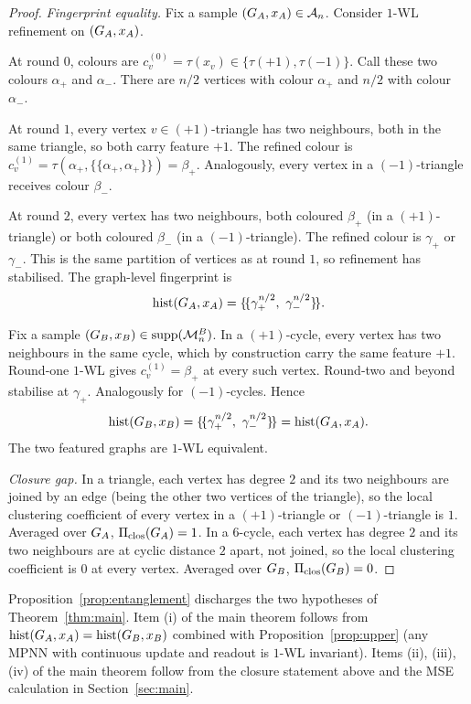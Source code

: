 \begin{proof}
\emph{Fingerprint equality.} Fix a sample $(G_A, x_A) \in
\mathcal{A}_n$. Consider $1$-WL refinement on $(G_A, x_A)$.

At round $0$, colours are $c_v^{(0)} = \tau(x_v) \in \{\tau(+1),
\tau(-1)\}$. Call these two colours $\alpha_+$ and $\alpha_-$. There
are $n/2$ vertices with colour $\alpha_+$ and $n/2$ with colour
$\alpha_-$.

At round $1$, every vertex $v \in (+1)$-triangle has two neighbours,
both in the same triangle, so both carry feature $+1$. The refined
colour is $c_v^{(1)} = \tau(\alpha_+, \{\!\{\alpha_+, \alpha_+\}\!\}) =
\beta_+$. Analogously, every vertex in a $(-1)$-triangle receives
colour $\beta_-$.

At round $2$, every vertex has two neighbours, both coloured
$\beta_+$ (in a $(+1)$-triangle) or both coloured $\beta_-$ (in a
$(-1)$-triangle). The refined colour is $\gamma_+$ or $\gamma_-$. This
is the same partition of vertices as at round $1$, so refinement has
stabilised. The graph-level fingerprint is
\[
\mathrm{hist}(G_A, x_A) = \{\!\{\gamma_+^{n/2},\ \gamma_-^{n/2}\}\!\}.
\]

Fix a sample $(G_B, x_B) \in \mathrm{supp}(\mathcal{M}_n^B)$. In a
$(+1)$-cycle, every vertex has two neighbours in the same cycle,
which by construction carry the same feature $+1$. Round-one $1$-WL
gives $c_v^{(1)} = \beta_+$ at every such vertex. Round-two and
beyond stabilise at $\gamma_+$. Analogously for $(-1)$-cycles.
Hence
\[
\mathrm{hist}(G_B, x_B) = \{\!\{\gamma_+^{n/2},\ \gamma_-^{n/2}\}\!\} =
\mathrm{hist}(G_A, x_A).
\]
The two featured graphs are $1$-WL equivalent.

\emph{Closure gap.} In a triangle, each vertex has degree $2$ and
its two neighbours are joined by an edge (being the other two
vertices of the triangle), so the local clustering coefficient of
every vertex in a $(+1)$-triangle or $(-1)$-triangle is $1$.
Averaged over $G_A$, $\Pi_{\mathrm{clos}}(G_A) = 1$. In a $6$-cycle,
each vertex has degree $2$ and its two neighbours are at cyclic
distance $2$ apart, not joined, so the local clustering coefficient
is $0$ at every vertex. Averaged over $G_B$, $\Pi_{\mathrm{clos}}(G_B)
= 0$.
\end{proof}

Proposition~\ref{prop:entanglement} discharges the two hypotheses of
Theorem~\ref{thm:main}. Item (i) of the main theorem follows from
$\mathrm{hist}(G_A, x_A) = \mathrm{hist}(G_B, x_B)$ combined
with Proposition~\ref{prop:upper} (any MPNN with continuous update and readout
is $1$-WL invariant). Items (ii), (iii), (iv) of the main theorem
follow from the closure statement above and the MSE calculation in
Section~\ref{sec:main}.

